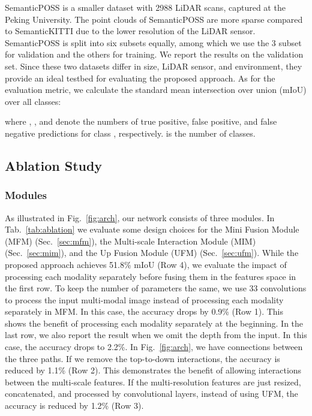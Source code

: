 \documentclass[letterpaper, 10 pt, journal, twoside]{ieeetran}
\newcommand{\figref}[1]{Fig.~\ref{#1}}
\newcommand{\tabref}[1]{Tab.~\ref{#1}}
\newcommand{\secref}[1]{Sec.~\ref{#1}}
\newcommand{\todo}[1]{#1}
\begin{document}
SemanticPOSS is a smaller dataset with 2988 LiDAR scans, captured at the Peking University. 
The point clouds of SemanticPOSS are more sparse compared to SemanticKITTI due to the lower resolution of the LiDAR sensor. 
SemanticPOSS is split into six subsets equally, among which we use the 3 subset for validation and the others for training.
We report the results on the validation set.
Since these two datasets differ in size, LiDAR sensor, and environment, they provide an ideal testbed for evaluating the proposed approach.    
As for the evaluation metric, we calculate the standard mean intersection over union (mIoU)
\cite{everingham2015pascal} over all classes:

where , , and  denote the numbers of true
positive, false positive, and false negative predictions for
class , respectively.
 is the number of classes.




\subsection{Ablation Study}

\subsubsection{Modules}\label{sec:modules}
As illustrated in \figref{fig:arch}, our network consists of three modules.
In \tabref{tab:ablation} we evaluate some design choices for the Mini Fusion Module (MFM) (\secref{sec:mfm}), the Multi-scale Interaction Module (MIM) (\secref{sec:mim}), and the Up Fusion Module (UFM) (\secref{sec:ufm}). 
While the proposed approach achieves 51.8\% mIoU (Row 4), we evaluate the impact of processing each modality separately before fusing them in the features space in the first row. To keep the number of parameters the same, we use 33 convolutions to process the input multi-modal image instead of processing each modality separately in MFM. In this case, the accuracy drops by 0.9\% (Row 1). This shows the benefit of processing each modality separately at the beginning. \todo{In the last row, we also report the result when we omit the depth from the input. In this case, the accuracy drops to 2.2\%.} In \figref{fig:arch}, we have connections between the three paths. If we remove the top-to-down interactions, the accuracy is reduced by 1.1\% (Row 2). This demonstrates the benefit of allowing interactions between the multi-scale features. If the multi-resolution features are just resized, concatenated, and processed by convolutional layers, instead of using UFM, the accuracy is reduced by 1.2\% (Row 3).
\end{document}
